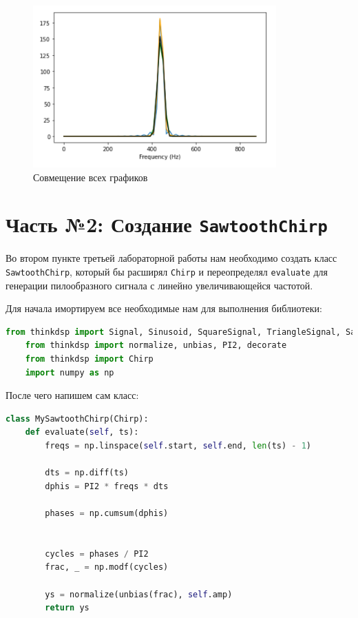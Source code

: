 \documentclass[a4paper]{article}
\begin{document}
            \begin{figure}[H]
                \centering
                \includegraphics{ex_1_all_in_one.png}
                \caption{Совмещение всех графиков}
                \label{fig:ex_1_all_in_one}
            \end{figure}
    
    \newpage
        \section{Часть №2: Создание \texttt{SawtoothChirp}}
            Во втором пункте третьей лабораторной работы нам необходимо создать класс \texttt{SawtoothChirp}, который бы расширял \texttt{Chirp} и переопределял \texttt{evaluate} для генерации пилообразного сигнала с линейно увеличивающейся частотой.
            
            Для начала имортируем все необходимые нам для выполнения библиотеки:
            
\begin{lstlisting}[language=Python, caption= Импорт библиотек]
    from thinkdsp import Signal, Sinusoid, SquareSignal, TriangleSignal, SawtoothSignal, ParabolicSignal
    from thinkdsp import normalize, unbias, PI2, decorate
    from thinkdsp import Chirp
    import numpy as np
\end{lstlisting}        
            
            После чего напишем сам класс:
            
\begin{lstlisting}[language=Python, caption= Класс \texttt{SawtoothChirp}]
    class MySawtoothChirp(Chirp):
    def evaluate(self, ts):
        freqs = np.linspace(self.start, self.end, len(ts) - 1)
        
        dts = np.diff(ts)
        dphis = PI2 * freqs * dts
        
        phases = np.cumsum(dphis)
        
        
        cycles = phases / PI2
        frac, _ = np.modf(cycles)

        ys = normalize(unbias(frac), self.amp)
        return ys
\end{lstlisting}      
            
\end{document}
